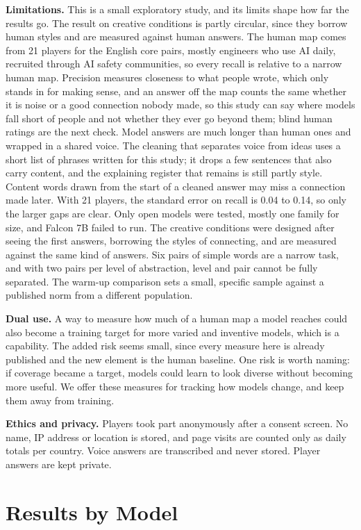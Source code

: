 \documentclass[11pt]{article}
\begin{document}
\textbf{Limitations.} This is a small exploratory study, and its limits shape how far the results go. The result on creative conditions is partly circular, since they borrow human styles and are measured against human answers. The human map comes from 21 players for the English core pairs, mostly engineers who use AI daily, recruited through AI safety communities, so every recall is relative to a narrow human map. Precision measures closeness to what people wrote, which only stands in for making sense, and an answer off the map counts the same whether it is noise or a good connection nobody made, so this study can say where models fall short of people and not whether they ever go beyond them; blind human ratings are the next check. Model answers are much longer than human ones and wrapped in a shared voice. The cleaning that separates voice from ideas uses a short list of phrases written for this study; it drops a few sentences that also carry content, and the explaining register that remains is still partly style. Content words drawn from the start of a cleaned answer may miss a connection made later. With 21 players, the standard error on recall is 0.04 to 0.14, so only the larger gaps are clear. Only open models were tested, mostly one family for size, and Falcon 7B failed to run. The creative conditions were designed after seeing the first answers, borrowing the styles of connecting, and are measured against the same kind of answers. Six pairs of simple words are a narrow task, and with two pairs per level of abstraction, level and pair cannot be fully separated. The warm-up comparison sets a small, specific sample against a published norm from a different population.

\textbf{Dual use.} A way to measure how much of a human map a model reaches could also become a training target for more varied and inventive models, which is a capability. The added risk seems small, since every measure here is already published and the new element is the human baseline. One risk is worth naming: if coverage became a target, models could learn to look diverse without becoming more useful. We offer these measures for tracking how models change, and keep them away from training.

\textbf{Ethics and privacy.} Players took part anonymously after a consent screen. No name, IP address or location is stored, and page visits are counted only as daily totals per country. Voice answers are transcribed and never stored. Player answers are kept private.

\section{Results by Model}
\label{app:models}
\end{document}
